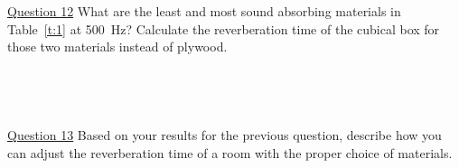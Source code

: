 \documentclass[11pt]{NSF}
\begin{document}
\underline{Question 12} What are the least and most sound absorbing materials in 
Table~\ref{t:1} at 500~Hz?
Calculate the reverberation time of the cubical box for 
those two materials instead of plywood.
\\
\\
\\
\\
\\

\underline{Question 13} Based on your results for the previous question, describe how you
can adjust the reverberation time of a room with the proper choice
of materials.
\\
\\
\\
\\
\\
\end{document}
